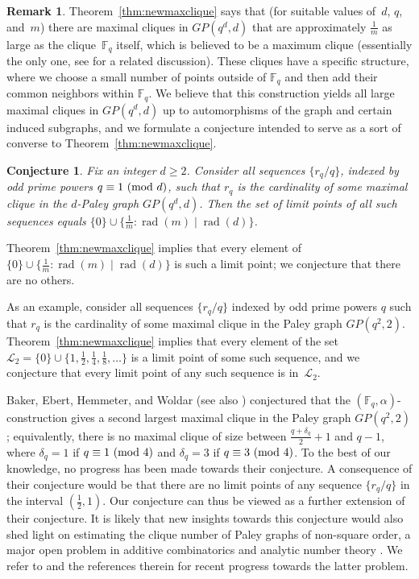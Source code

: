 \documentclass[12pt,reqno]{amsart}
\newtheorem{conj}[thm]{Conjecture}
\theoremstyle{definition}
\newtheorem{rem}[thm]{Remark}
\newcommand{\F}{\mathbb{F}}
\newcommand{\rad}{\operatorname{rad}}
\renewcommand{\pmod}[1]{{\ifmmode\text{\rm\ (mod~$#1$)}\else\discretionary{}{}{\hbox{ }}\rm(mod~$#1$)\fi}}
\begin{document}
\begin{rem}
Theorem~\ref{thm:newmaxclique} says that (for suitable values of~$d$, $q$, and~$m$) there are maximal cliques in $GP(q^d,d)$ that are approximately $\frac1m$ as large as the clique~$\F_q$ itself, which is believed to be a maximum clique (essentially the only one, see \cite{Y23++} for a related discussion). These cliques have a specific structure, where we choose a small number of points outside of $\F_q$ and then add their common neighbors within $\F_q$. We believe that this construction yields all large maximal cliques in $GP(q^d,d)$ up to automorphisms of the graph and certain induced subgraphs, and we formulate a conjecture intended to serve as a sort of converse to Theorem~\ref{thm:newmaxclique}.

\begin{conj} \label{spectrum conj}
Fix an integer $d\ge2$. Consider all sequences $\{r_q / q\}$, indexed by odd prime powers $q\equiv1\pmod d$, such that $r_q$ is the cardinality of some maximal clique in the $d$-Paley graph $GP(q^d,d)$. Then the set of limit points of all such sequences equals $\{0\} \cup \{\frac1m\colon \rad(m) \mid \rad(d)\}$.
\end{conj}

\noindent Theorem~\ref{thm:newmaxclique} implies that every element of $\{0\} \cup \{\frac1m\colon \rad(m) \mid \rad(d)\}$ is such a limit point; we conjecture that there are no others.

As an example, consider all sequences $\{r_q / q\}$ indexed by odd prime powers $q$ such that $r_q$ is the cardinality of some maximal clique in the Paley graph $GP(q^2,2)$. Theorem~\ref{thm:newmaxclique} implies that every element of the set
$
\mathcal{L}_2=\{0\} \cup \{1,\frac12,\frac14,\frac18,\dots\}
$
is a limit point of some such sequence, and we conjecture that every limit point of any such sequence is in~$\mathcal{L}_2$. 

Baker, Ebert, Hemmeter, and Woldar \cite{BEHW96} (see also \cite{GKSV18,GMS22})  conjectured that the $(\F_q,\alpha)$-construct\-ion gives a second largest maximal clique in the Paley graph $GP(q^2,2)$; equivalently, there is no maximal clique of size between $\frac{q+\delta_q}{2}+1$ and $q-1$, where $\delta_q=1$ if $q \equiv 1 \pmod 4$ and $\delta_q=3$ if $q \equiv 3 \pmod 4$. To the best of our knowledge, no progress has been made towards their conjecture. A consequence of their conjecture would be that there are no limit points of any sequence $\{r_q/q\}$ in the interval $(\frac12,1)$. Our conjecture can thus be viewed as a further extension of their conjecture.  It is likely that new insights towards this conjecture would also shed light on estimating the clique number of Paley graphs of non-square order, a major open problem in additive combinatorics and analytic number theory \cite{CL07}. We refer to \cite{Y23++} and the references therein for recent progress towards the latter problem.


\end{rem}
\end{document}
